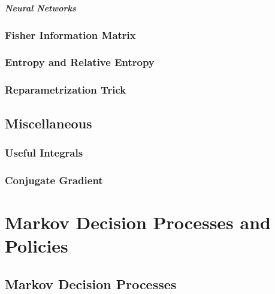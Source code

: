                 \paragraph{Neural Networks} %

        \subsection{Fisher Information Matrix} %

        \subsection{Entropy and Relative Entropy} %

        \subsection{Reparametrization Trick} %

    \section{Miscellaneous} %

        \subsection{Useful Integrals} %

        \subsection{Conjugate Gradient} %

\chapter{Markov Decision Processes and Policies} %

    \section{Markov Decision Processes} %

